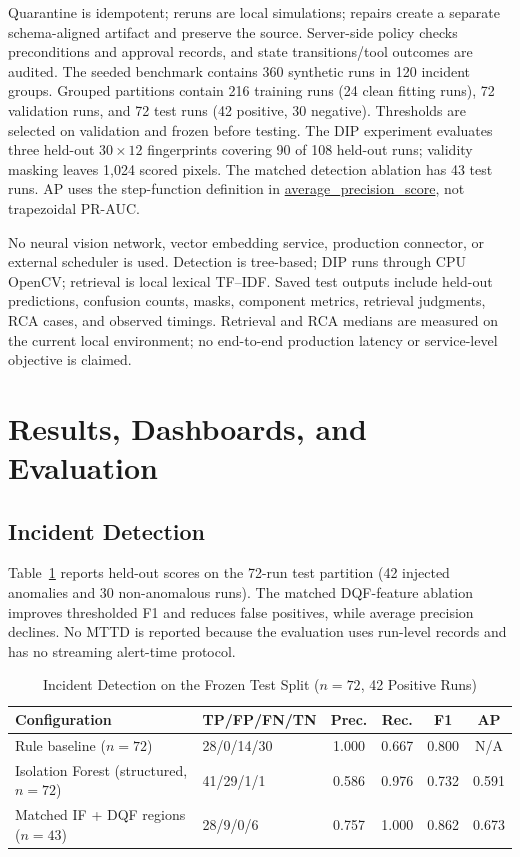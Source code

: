 \documentclass[conference]{IEEEtran}
\begin{document}
Quarantine is idempotent; reruns are local simulations; repairs create a separate schema-aligned artifact and preserve the source. Server-side policy checks preconditions and approval records, and state transitions/tool outcomes are audited. The seeded benchmark contains 360 synthetic runs in 120 incident groups. Grouped partitions contain 216 training runs (24 clean fitting runs), 72 validation runs, and 72 test runs (42 positive, 30 negative). Thresholds are selected on validation and frozen before testing. The DIP experiment evaluates three held-out $30\times12$ fingerprints covering 90 of 108 held-out runs; validity masking leaves 1,024 scored pixels. The matched detection ablation has 43 test runs. AP uses the step-function definition in \url{average_precision_score}, not trapezoidal PR-AUC.

No neural vision network, vector embedding service, production connector, or external scheduler is used. Detection is tree-based; DIP runs through CPU OpenCV; retrieval is local lexical TF--IDF. Saved test outputs include held-out predictions, confusion counts, masks, component metrics, retrieval judgments, RCA cases, and observed timings. Retrieval and RCA medians are measured on the current local environment; no end-to-end production latency or service-level objective is claimed.

\section{Results, Dashboards, and Evaluation}
\subsection{Incident Detection}
Table~\ref{tab:detection} reports held-out scores on the 72-run test partition (42 injected anomalies and 30 non-anomalous runs). The matched DQF-feature ablation improves thresholded F1 and reduces false positives, while average precision declines. No MTTD is reported because the evaluation uses run-level records and has no streaming alert-time protocol.

\begin{table}[t]
\caption{Incident Detection on the Frozen Test Split ($n=72$, 42 Positive Runs)}
\label{tab:detection}
\centering
\footnotesize
\begin{tabular}{@{}lp{0.95in}cccc@{}}
\toprule
\textbf{Configuration} & \textbf{TP/FP/FN/TN} & \textbf{Prec.} & \textbf{Rec.} & \textbf{F1} & \textbf{AP}\\
\midrule
Rule baseline ($n=72$) & 28/0/14/30 & 1.000 & 0.667 & 0.800 & N/A\\
Isolation Forest (structured, $n=72$) & 41/29/1/1 & 0.586 & 0.976 & 0.732 & 0.591\\
Matched IF + DQF regions ($n=43$) & 28/9/0/6 & 0.757 & 1.000 & 0.862 & 0.673\\
\bottomrule
\end{tabular}
\end{table}
\end{document}

